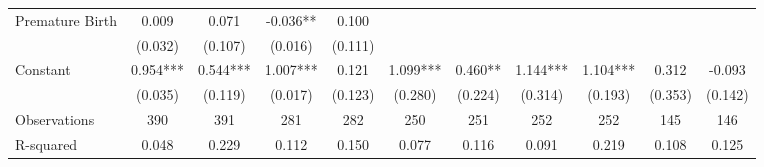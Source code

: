 \begin{tabular}{lcccccccccc}
Premature Birth & 0.009 & 0.071 & -0.036** & 0.100 &  &  &  &  &  &  \\
 & (0.032) & (0.107) & (0.016) & (0.111) &  &  &  &  &  &  \\
Constant & 0.954*** & 0.544*** & 1.007*** & 0.121 & 1.099*** & 0.460** & 1.144*** & 1.104*** & 0.312 & -0.093 \\
 & (0.035) & (0.119) & (0.017) & (0.123) & (0.280) & (0.224) & (0.314) & (0.193) & (0.353) & (0.142) \\
\midrule
Observations & 390 & 391 & 281 & 282 & 250 & 251 & 252 & 252 & 145 & 146 \\
 R-squared & 0.048 & 0.229 & 0.112 & 0.150 & 0.077 & 0.116 & 0.091 & 0.219 & 0.108 & 0.125 \\ \bottomrule
\end{tabular}
